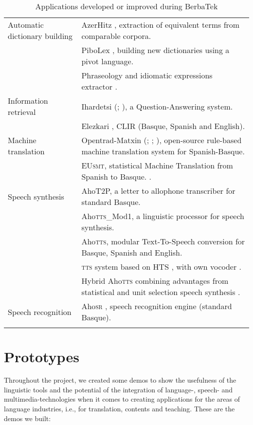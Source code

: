 \documentclass[output=paper]{LSP/langsci}
\begin{document}
\begin{table}[t]\small
  \begin{tabularx}{\textwidth}{lQ}
   \lsptoprule
Automatic dictionary building & AzerHitz \citep{SaralegiEtAl2008}, extraction of equivalent terms from comparable corpora.\\
& PiboLex \citep{SaralegiEtAl2012}, building new dictionaries using a pivot language.\\
& Phraseology and idiomatic expressions extractor \citep{Gurrutxaga2011}.\\
Information retrieval  & Ihardetsi (\citealt{AnsaEtAl2008}; \citealt{AgirreEtAl2009b}), a Question-Answering system.\\
& Elezkari \citep{Saralegi2009}, CLIR (Basque, Spanish and English).\\
Machine translation & Opentrad-Matxin (\citealt{AlegriaEtAl2007}; \citealt{AlegriaEtAl2008}; \citealt{MayorEtAl2011}), open-source rule-based machine translation system for Spanish-Basque.\\
& EU\textsc{smt}, statistical Machine Translation from Spanish to Basque. \citep{Labaka2010}.\\
Speech synthesis & AhoT2P, a letter to allophone transcriber for standard Basque.\\
& Aho\textsc{tts}\_Mod1, a linguistic processor for speech synthesis.\\
& Aho\textsc{tts}, modular Text-To-Speech conversion for Basque, Spanish and English.\\
& \textsc{tts} system based on HTS \citep{ErroEtAl2010}, with own vocoder \citep{ErroEtAl2011a}.\\
& Hybrid Aho\textsc{tts} combining advantages from statistical and unit selection speech synthesis \citep{ErroEtAl2010}.\\
Speech recognition & Aho\textsc{sr} \citep{OdriozolaEtAl2012}, speech recognition engine (standard Basque).\\
\lspbottomrule
\end{tabularx}
\caption{Applications developed or improved during BerbaTek}
\label{tab:leturia:3}
\end{table}

\section{Prototypes}\label{sec:leturia:5}

Throughout the project, we created some demos to show the usefulness of the linguistic tools and the potential of the integration of language-, speech- and multimedia-technologies when it comes to creating applications for the areas of language industries, i.e., for translation, contents and teaching. These are the demos we built:
\end{document}
